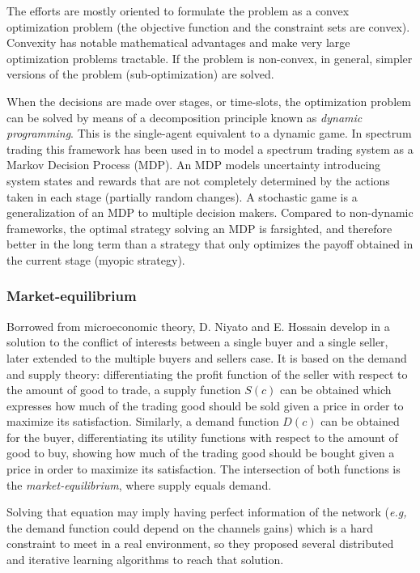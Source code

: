 The efforts are mostly oriented to formulate the problem as a convex optimization problem (the objective function and the constraint sets are convex).
Convexity has notable mathematical advantages and make very large optimization problems tractable.
If the problem is non-convex, in general, simpler versions of the problem (sub-optimization) are solved.

When the decisions are made over stages, or time-slots, the optimization problem can be solved by means of a decomposition principle known as \textit{dynamic programming}. 
This is the single-agent equivalent to a dynamic game. 
In spectrum trading this framework has been used in \cite{ref:Mutlu2008} to model a spectrum trading system as a Markov Decision Process (MDP). 
An MDP models uncertainty introducing system states and rewards that are not completely determined by the actions taken in each stage (partially random changes).  
A stochastic game is a generalization of an MDP to multiple decision makers. 
Compared to non-dynamic frameworks, the optimal strategy solving an MDP is farsighted, and therefore better in the long term than a strategy that only optimizes the payoff obtained in the current stage (myopic strategy).

\subsubsection{Market-equilibrium}
\label{subsec:marketeq}
Borrowed from microeconomic theory, D. Niyato and E. Hossain develop in \cite{ref:Niyato2007_Hier,ref:Niyato2007_Eq,ref:Niyato2008_Mark,ref:Niyato2008_Spec,ref:Niyato2010,ref:Xu2011} a solution to the conflict of interests between a single buyer and a single seller, later extended to the multiple buyers and sellers case.
It is based on the demand and supply theory: differentiating the profit function of the seller with respect to the amount of good to trade, a supply function $S(c)$ can be obtained which expresses how much of the trading good should be sold given a price in order to maximize its satisfaction. 
Similarly, a demand function $D(c)$ can be obtained for the buyer, differentiating its utility functions with respect to the amount of good to buy, showing how much of the trading good should be bought given a price in order to maximize its satisfaction. 
The intersection of both functions is the \textit{market-equilibrium}, where supply equals demand.

Solving that equation may imply having perfect information of the network (\textit{e.g,} the demand function could depend on the channels gains) which is a hard constraint to meet in a real environment, so they proposed several distributed and iterative learning algorithms to reach that solution. 

